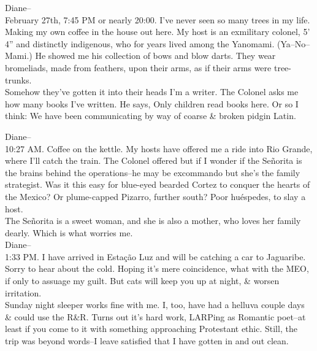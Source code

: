 Diane-- \\
February 27th, 7:45 PM or nearly 20:00. I've never seen so many trees in my life. \\
Making my own coffee in the house out here. My host is an exmilitary colonel, 5' 4'' and distinctly indigenous, who for years lived among the Yanomami. (Ya--No--Mami.) He showed me his collection of bows and blow darts. They wear bromeliads, made from feathers, upon their arms, as if their arms were tree-trunks. \\
Somehow they've gotten it into their heads I'm a writer. The Colonel asks me how many books I've written. He says, Only children read books here. Or so I think: We have been communicating by way of coarse \& broken pidgin Latin. 

Diane-- \\
10:27 AM. Coffee on the kettle. My hosts have offered me a ride into Rio Grande, where I'll catch the train. The Colonel offered but if I wonder if the Señorita is the brains behind the operations--he may be excommando but she's the family strategist. Was it this easy for blue-eyed bearded Cortez to conquer the hearts of the Mexico? Or plume-capped Pizarro, further south? Poor huéspedes, to slay a host. \\
The Señorita is a sweet woman, and she is also a mother, who loves her family dearly. Which is what worries me. \\

Diane-- \\
1:33 PM. I have arrived in Estação Luz and will be catching a car to Jaguaribe. Sorry to hear about the cold. Hoping it's mere coincidence, what with the MEO, if only to assuage my guilt. But cats will keep you up at night, \& worsen irritation. \\
Sunday night sleeper works fine with me. I, too, have had a helluva couple days \& could use the R\&R. Turns out it's hard work, LARPing as Romantic poet--at least if you come to it with something approaching Protestant ethic. Still, the trip was beyond words--I leave satisfied that I have gotten in and out clean.